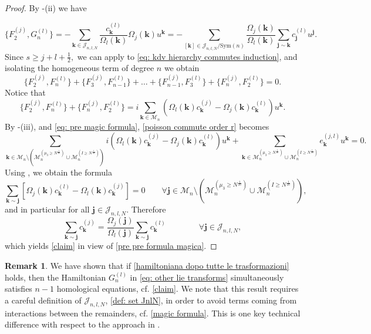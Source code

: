 \documentclass[a4paper,10pt,reqno]{article}
\theoremstyle{definition}
\theoremstyle{plain}
\theoremstyle{plain}
\theoremstyle{definition}
\theoremstyle{plain}
\theoremstyle{plain}
\theoremstyle{plain}
\theoremstyle{definition}
\newtheorem{rem}[definition]{Remark}
\theoremstyle{definition}
\def \N{\mathbb N}
\def \M{\mathcal{M}}
\def \k{\bm{k}}
\def \j{\bm{j}}
\begin{document}
\begin{proof}
By -(ii) we have 

\begin{equation}\label{pre pre formula magica}
\{ F_2^{(j)} , G_{n}^{(l)} \}  = - \sum_{\k \in \mathcal{J}_{n,l,N}} \frac{c_{\k}^{(l)}}{\Omega_l(\k)} \Omega_j(\k) u^{\k} = - \sum_{[\k] \in \mathcal{J}_{n,l,N}/\mbox{Sym}(n)} \frac{\Omega_j(\k)}{\Omega_l(\k)} \sum_{\j \sim \k} c_{\j}^{(l)} u^{\j}.
\end{equation}
Since $s \ge j+l+\frac{1}{2},$ we can apply  to \eqref{eq: kdv hierarchy commutes induction}, and isolating the homogeneous term of degree $n$ we obtain
\begin{equation}
\{ F_2^{(j)}, F_{n}^{(l)} \} + \{ F_3^{(j)}, F_{n-1}^{(l)} \} + \ldots + \{ F_{n-1}^{(j)}, F_3^{(l)} \} + \{ F_{n}^{(j)}, F_2^{(l)} \} = 0.
\label{poisson commute order r}
\end{equation}
Notice that
\[
\{ F_2^{(j)}, F_{n}^{(l)} \} + \{ F_{n}^{(j)}, F_2^{(l)} \} = i \sum_{\k \in \M_{n}} \left ( \Omega_l(\k) c_{\k}^{(j)} - \Omega_j(\k) c_{\k}^{(l)} \right ) u^{\k}.
\]
By -(iii),  and \eqref{eq: pre magic formula}, \eqref{poisson commute order r} becomes
\[
\sum_{\k \in \M_{n} \setminus \left ( \M_{n}^{(\mu_3 \ge N^{\frac{1}{2n}})} \cup \M_{n}^{(I \ge N^{\frac{1}{2n}})} \right ) } i \left ( \Omega_l(\k) c_{\k}^{(j)} - \Omega_j(\k) c_{\k}^{(l)} \right ) u^{\k} + \sum_{\k \in \M_{n}^{(\mu_3 \ge N^{\frac{1}{2n}})} \cup \M_{n}^{(I \ge N^{\frac{1}{2n}})}} e_{\k}^{(j,l)} u^{\k} = 0.
\]
Using , we obtain the formula
\begin{equation}
\sum_{\k \sim \j} \left [ \Omega_j(\k) c_{\k}^{(l)} - \Omega_l(\k) c_{\k}^{(j)} \right ] = 0 \qquad \forall \j \in \M_{n} \setminus \left ( \M_{n}^{(\mu_3 \ge N^{\frac{1}{2n}})} \cup \M_{n}^{(I \ge N^{\frac{1}{2n}})} \right ),
\label{magic formula}
\end{equation}
and in particular for all $\j \in \mathcal{J}_{n,l,N}.$
Therefore
\[
\sum_{\k \sim \j} c_{\k}^{(j)} = \frac{\Omega_j(\j)}{\Omega_l(\j)} \sum_{\k \sim \j} c_{\k}^{(l)} \qquad \qquad \forall \j \in \mathcal{J}_{n,l,N},
\]
which yields \eqref{claim} in view of \eqref{pre pre formula magica}.
\end{proof}

\begin{rem}
We have shown that if \eqref{hamiltoniana dopo tutte le trasformazioni} holds, then the Hamiltonian $G_n^{(l)}$ in \eqref{eq: other lie transforms} simultaneously satisfies $n-1$ homological equations, cf. \eqref{claim}. We note that this result requires a careful definition of $\mathcal{J}_{n,l,N}$, \eqref{def: set JnlN}, in order to avoid terms coming from interactions between the remainders, cf. \eqref{magic formula}. 
This is one key technical difference with respect to the approach in \cite{bernier}.
\end{rem}
\end{document}
